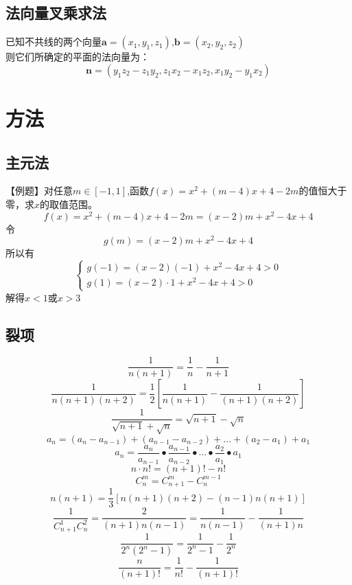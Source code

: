 \documentclass[UTF8]{ctexart}
\begin{document}
		\subsection{法向量叉乘求法}
			已知不共线的两个向量$\boldsymbol{a}=(x_1,y_1,z_1)$,$\boldsymbol{b}=(x_2,y_2,z_2)$\\
			则它们所确定的平面的法向量为：
			\[\boldsymbol{n}=(y_1 z_2-z_1 y_2,z_1 x_2-x_1 z_2,x_1 y_2-y_1 x_2)\]
	\section{方法}
		\subsection{主元法}
			【例题】对任意$m\in [-1,1]$,函数$f(x)=x^2+(m-4)x+4-2m$的值恒大于零，求$x$的取值范围。\\
			\[f(x)=x^2+(m-4)x+4-2m=(x-2)m+x^2-4x+4\]
			令
			\[g(m)=(x-2)m+x^2-4x+4\]
			所以有
			\[\begin{cases}
				g(-1)=(x-2)(-1)+x^2-4x+4>0
				\\
				g(1)=(x-2)\cdot 1+x^2-4x+4>0
			\end{cases}\]
			解得$x<1 $或$ x>3$
		\subsection{裂项}
			\[\frac{1}{n(n+1)}=\frac{1}{n}-\frac{1}{n+1}\]
			\[\frac{1}{n(n+1)(n+2)}=\frac{1}{2}\left[\frac{1}{n(n+1)}-\frac{1}{(n+1)(n+2)}\right] \]
			\[\frac{1}{\sqrt{n+1}+\sqrt{n}}=\sqrt{n+1}-\sqrt{n}\]
			\[a_n=(a_n-a_{n-1})+(a_{n-1}-a_{n-2})+\dots+(a_2-a_1)+a_1\]
			\[a_n=\frac{a_n}{a_{n-1}}\bullet\frac{a_{n-1}}{a_{n-2}}\bullet\dots\bullet\frac{a_2}{a_1}\bullet a_1\]
			\[n\cdot n!=(n+1)!-n!\]
			\[C^{m}_{n}=C^{m}_{n+1}-C^{m-1}_{n}\]
			\[n(n+1)=\frac{1}{3}\left[n(n+1)(n+2)-(n-1)n(n+1)\right]\]
			\[\frac{1}{C^{1}_{n+1}C^{2}_{n}}=\frac{2}{(n+1)n(n-1)}=\frac{1}{n(n-1)}-\frac{1}{(n+1)n}\]
			\[\frac{1}{2^n(2^n-1)}=\frac{1}{2^n-1}-\frac{1}{2^n}\]
			\[\frac{n}{(n+1)!}=\frac{1}{n!}-\frac{1}{(n+1)!}\]
\end{document}

